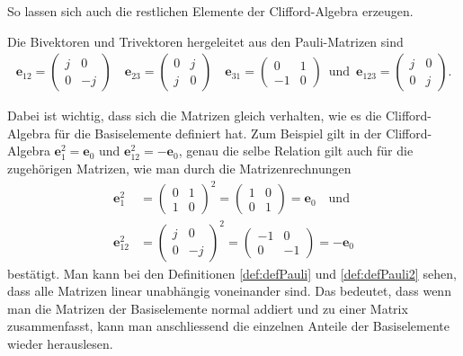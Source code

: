 So lassen sich auch die restlichen Elemente der Clifford-Algebra erzeugen.
\begin{definition} \label{def:defPauli2} 
	Die Bivektoren und Trivektoren hergeleitet aus den Pauli-Matrizen sind
	\begin{align} \label{Pauli2}
	\mathbf{e}_{12} =  
	\begin{pmatrix}
	j & 0 \\
	0 & -j
	\end{pmatrix}\quad
	\mathbf{e}_{23} =
	\begin{pmatrix}
	0 & j \\
	j & 0
	\end{pmatrix}\quad
	\mathbf{e}_{31} =
	\begin{pmatrix}
	0 & 1 \\
	-1 & 0
	\end{pmatrix}\enspace\text{und}\enspace
	\mathbf{e}_{123} =
	\begin{pmatrix}
	j & 0 \\
	0 & j
	\end{pmatrix}.
	\end{align}
\end{definition}
Dabei ist wichtig, dass sich die Matrizen gleich verhalten, wie es die Clifford-Algebra für die Basiselemente definiert hat. Zum Beispiel gilt in der Clifford-Algebra $\mathbf{e}_1^2=\mathbf{e}_0$ und $\mathbf{e}_{12}^2=-\mathbf{e}_0$, genau die selbe Relation gilt auch für die zugehörigen Matrizen, wie man durch die Matrizenrechnungen
\begin{align*}
\mathbf{e}_1^2 &=
\begin{pmatrix}
0 & 1 \\
1 & 0
\end{pmatrix}^2 = 
\begin{pmatrix}
1 & 0 \\
0 & 1
\end{pmatrix}= \mathbf{e}_0 \quad\text{und}\\
\mathbf{e}_{12}^2 &=
\begin{pmatrix}
j & 0 \\
0 & -j
\end{pmatrix}^2 = 
\begin{pmatrix}
-1 & 0 \\
0 & -1
\end{pmatrix} = -\mathbf{e}_0 
\end{align*}
bestätigt.
Man kann bei den Definitionen \ref{def:defPauli} und \ref{def:defPauli2} sehen, dass alle Matrizen linear unabhängig voneinander sind.
Das bedeutet, dass wenn man die Matrizen der Basiselemente normal addiert und zu einer Matrix zusammenfasst, kann man anschliessend die einzelnen Anteile der Basiselemente wieder herauslesen.
